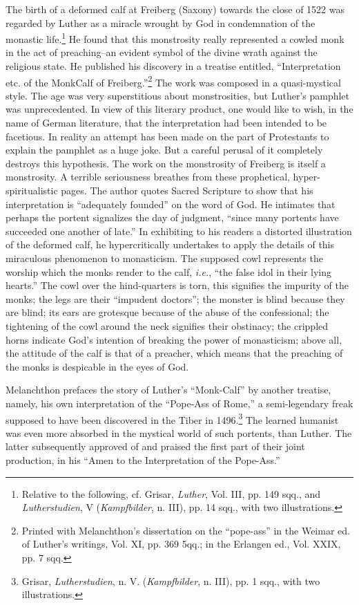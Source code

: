 The birth of a deformed calf at Freiberg (Saxony) towards the
close of 1522 was regarded by Luther as a miracle wrought by God in
condemnation of the monastic life.\footnote
{Relative to the following, cf. Grisar, \textit{Luther}, Vol. III, pp. 149 sqq., and \textit{Lutherstudien},
V (\textit{Kampfbilder}, n. III), pp. 14 sqq., with two illustrations.}
He found that this monstrosity
really represented a cowled monk in the act of preaching--an evident
symbol of the divine wrath against the religious state. He published
his discovery in a treatise entitled, “Interpretation etc. of the MonkCalf
of Freiberg.”\footnote
{Printed with Melanchthon’s dissertation on the “pope-ass” in the Weimar ed. of
Luther’s writings, Vol. XI, pp. 369 5qq.; in the Erlangen ed., Vol. XXIX, pp. 7 sqq.}
The work was composed in a quasi-mystical
style. The age was very superstitious about monstrosities, but Luther’s
pamphlet was unprecedented. In view of this literary product, one
would like to wish, in the name of German literature, that the interpretation
had been intended to be facetious. In reality an attempt
has been made on the part of Protestants to explain the pamphlet
as a huge joke. But a careful perusal of it completely destroys this
hypothesis. The work on the monstrosity of Freiberg is itself a
monstrosity. A terrible seriousness breathes from these prophetical,
hyper-spiritualistic pages. The author quotes Sacred Scripture to
show that his interpretation is “adequately founded” on the word
of God. He intimates that perhaps the portent signalizes the day
of judgment, “since many portents have succeeded one another of
late.” In exhibiting to his readers a distorted illustration of the deformed
calf, he hypercritically undertakes to apply the details of
this miraculous phenomenon to monasticism. The supposed cowl
represents the worship which the monks render to the calf, \textit{i.e.}, “the
false idol in their lying hearts.” The cowl over the hind-quarters
is torn, this signifies the impurity of the monks; the legs are their
“impudent doctors”; the monster is blind because they are blind;
its ears are grotesque because of the abuse of the confessional; the
tightening of the cowl around the neck signifies their obstinacy;
the crippled horns indicate God’s intention of breaking the power
of monasticism; above all, the attitude of the calf is that of a
preacher, which means that the preaching of the monks is despicable
in the eyes of God.

Melanchthon prefaces the story of Luther’s “Monk-Calf” by another treatise,
namely, his own interpretation of the “Pope-Ass of
Rome,” a semi-legendary freak supposed to have been discovered in
the Tiber in 1496.\footnote{Grisar, \textit{Lutherstudien}, n. V. (\textit{Kampfbilder}, n. III), pp. 1 sqq., with two illustrations.}
The learned humanist was even more absorbed
in the mystical world of such portents, than Luther. The latter
subsequently approved of and praised the first part of their joint
production, in his “Amen to the Interpretation of the Pope-Ass.”

